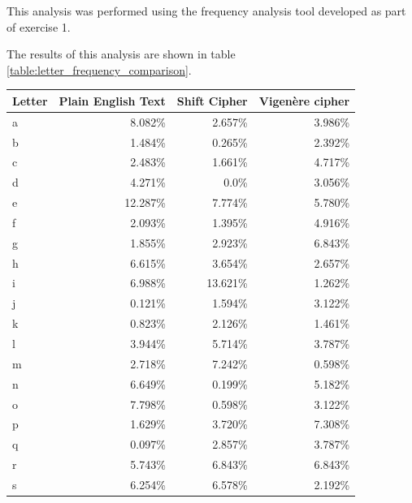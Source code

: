 \documentclass[a4paper]{article}
\newcommand{\Vigenere}{Vigen\`{e}re }
\begin{document}
This analysis was performed using the frequency analysis tool developed as part
of exercise 1.

The results of this analysis are shown in table
\ref{table:letter_frequency_comparison}.

\begin{table}[h]
  \centering
    \scriptsize
  \begin{tabular}{@{}lrrr@{}}
    \toprule
    Letter & Plain English Text & Shift Cipher & \Vigenere cipher \\
    \midrule
    a      & 8.082\%            & 2.657\%      & 3.986\%          \\
    b      & 1.484\%            & 0.265\%      & 2.392\%          \\
    c      & 2.483\%            & 1.661\%      & 4.717\%          \\
    d      & 4.271\%            & 0.0\%        & 3.056\%          \\
    e      & 12.287\%           & 7.774\%      & 5.780\%          \\
    f      & 2.093\%            & 1.395\%      & 4.916\%          \\
    g      & 1.855\%            & 2.923\%      & 6.843\%          \\
    h      & 6.615\%            & 3.654\%      & 2.657\%          \\
    i      & 6.988\%            & 13.621\%     & 1.262\%          \\
    j      & 0.121\%            & 1.594\%      & 3.122\%          \\
    k      & 0.823\%            & 2.126\%      & 1.461\%          \\
    l      & 3.944\%            & 5.714\%      & 3.787\%          \\
    m      & 2.718\%            & 7.242\%      & 0.598\%          \\
    n      & 6.649\%            & 0.199\%      & 5.182\%          \\
    o      & 7.798\%            & 0.598\%      & 3.122\%          \\
    p      & 1.629\%            & 3.720\%      & 7.308\%          \\
    q      & 0.097\%            & 2.857\%      & 3.787\%          \\
    r      & 5.743\%            & 6.843\%      & 6.843\%          \\
    s      & 6.254\%            & 6.578\%      & 2.192\%          \\

\end{tabular}
\end{table}
\end{document}
